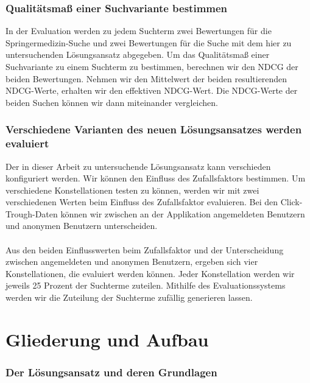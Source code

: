 {\subsubsection{Qualitätsmaß einer Suchvariante bestimmen}
\label{sec:Einfuehrung:Methodik:Evaluation:QualitaetMessen}

In der Evaluation werden zu jedem Suchterm zwei Bewertungen für die Springermedizin-Suche und zwei Bewertungen für die Suche mit dem hier zu untersuchenden Lösungsansatz abgegeben. Um das Qualitätsmaß einer Suchvariante zu einem Suchterm zu bestimmen, berechnen wir den NDCG der beiden Bewertungen. Nehmen wir den Mittelwert der beiden resultierenden NDCG-Werte, erhalten wir den effektiven NDCG-Wert. Die NDCG-Werte der beiden Suchen können wir dann miteinander vergleichen.

\subsubsection{Verschiedene Varianten des neuen Lösungsansatzes werden evaluiert}
\label{sec:Einfuehrung:Methodik:Evaluation:EvaluationsdatenVarianteLoesungsansatzes}

Der in dieser Arbeit zu untersuchende Lösungsansatz kann verschieden konfiguriert werden. Wir können den Einfluss des Zufallsfaktors bestimmen. Um verschiedene Konstellationen testen zu können, werden wir mit zwei verschiedenen Werten beim Einfluss des Zufallsfaktor evaluieren. Bei den Click-Trough-Daten können wir zwischen an der Applikation angemeldeten Benutzern und anonymen Benutzern unterscheiden.
\\
\\
Aus den beiden Einflusswerten beim Zufallsfaktor und der Unterscheidung zwischen angemeldeten und anonymen Benutzern, ergeben sich vier Konstellationen, die evaluiert werden können. Jeder Konstellation werden wir jeweils 25 Prozent der Suchterme zuteilen. Mithilfe des Evaluationssystems werden wir die Zuteilung der Suchterme zufällig generieren lassen.

\section{Gliederung und Aufbau}
\label{sec:Einfuehrung:GliederungAufbau}

\subsubsection{Der Lösungsansatz und deren Grundlagen}
\label{sec:Einfuehrung:GliederungAufbau:Loesungsansatz}

}
